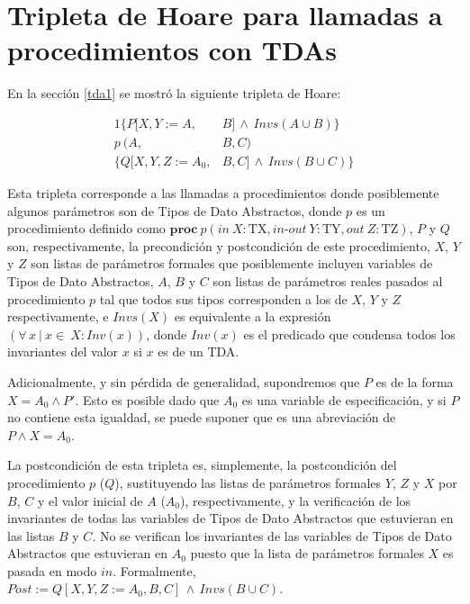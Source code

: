 \chapter{Tripleta de Hoare para llamadas a procedimientos con TDAs}
\label{derivhoare}

En la sección \ref{tda1} se mostró la siguiente tripleta de Hoare:

\begin{alignat}{1}%
  \{ P[X,Y:=A,&B]\, \land \, Invs(A \cup B)\} \nonumber \\
  p\  (A,&B,C) \label{eqn:tdatriple2} \\ 
  \{ Q[X,Y,Z:=A_0,&B,C]\, \land \, Invs(B \cup C)\} \nonumber
\end{alignat}

Esta tripleta corresponde a las llamadas a procedimientos donde 
posiblemente algunos parámetros son de Tipos de Dato Abstractos,
donde $p$ es un procedimiento definido como
$\textbf{proc}\ p (in\ X : \textrm{TX}, in\textrm{-}out\ Y : \textrm{TY}, out\ Z : \textrm{TZ})$, $P$ y $Q$ son, respectivamente, la precondición y postcondición de este procedimiento, $X$, $Y$ y $Z$ son listas de parámetros formales que posiblemente incluyen
variables de Tipos de Dato Abstractos, $A$, $B$ y $C$ son listas de parámetros reales pasados al procedimiento $p$ tal que todos sus tipos corresponden a los de $X$, $Y$ y $Z$ respectivamente, e $Invs(X)$ es equivalente a la expresión $(\forall\, x\ |\ x \in\ X : Inv(x) )$, donde $Inv(x)$ es el predicado que condensa todos los
invariantes del valor $x$ si $x$ es de un TDA.

Adicionalmente, y sin pérdida de generalidad, supondremos que $P$ es de la forma $X = A_0 \land P'$. Esto es posible dado que $A_0$ es una variable de 
especificación, y si $P$ no contiene esta igualdad, se puede suponer que es
una abreviación de $P \land X = A_0$.

La postcondición de esta tripleta es, simplemente, la postcondición del procedimiento $p$ ($Q$), sustituyendo las listas de parámetros formales $Y$, $Z$ y $X$ por $B$, $C$ y el valor inicial de $A$ ($A_0$), respectivamente, y la verificación de los invariantes de todas las variables de Tipos de Dato Abstractos que estuvieran en las listas $B$ y $C$. No se verifican los 
invariantes de las variables de Tipos de Dato Abstractos que estuvieran en 
$A_0$ puesto que la lista de parámetros formales $X$ es pasada en modo $in$. Formalmente, $Post := Q[X,Y,Z := A_0,B,C]\, \land \, Invs(B \cup C)$.


